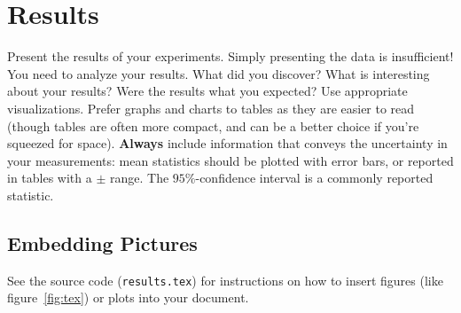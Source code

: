 
\section{Results}
\label{sec:results}

Present the results of your experiments. Simply presenting the data is
insufficient! You need to analyze your results. What did you discover?
What is interesting about your results? Were the results what you
expected? Use appropriate visualizations. Prefer graphs and charts to
tables as they are easier to read (though tables are often more
compact, and can be a better choice if you're squeezed for space).
\textbf{Always} include information that conveys the uncertainty in
your measurements: mean statistics should be plotted with error bars,
or reported in tables with a $\pm$ range. The $95\%$-confidence
interval is a commonly reported statistic.

\subsection{Embedding Pictures}
\label{subsec:pics}

See the source code (\texttt{results.tex}) for instructions on how to
insert figures (like figure~\ref{fig:tex}) or plots into your
document.


